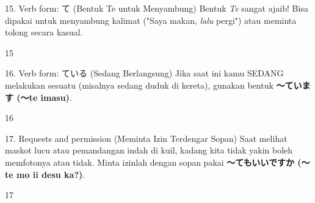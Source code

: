 \begin{lessonbox}{15. Verb form: て (Bentuk Te untuk Menyambung)}
    Bentuk \textit{Te} sangat ajaib! Bisa dipakai untuk menyambung kalimat ("Saya makan, \textit{lalu} pergi") atau meminta tolong secara kasual.
\end{lessonbox}
\begin{convobox}{15}
    \noindent
      

    \vspace{1.5em}
\end{convobox}

\begin{lessonbox}{16. Verb form: ている (Sedang Berlangsung)}
    Jika saat ini kamu SEDANG melakukan sesuatu (misalnya sedang duduk di kereta), gunakan bentuk \textbf{〜ています (〜te imasu)}.
\end{lessonbox}
\begin{convobox}{16}
    \noindent
      

    \vspace{1.5em}
\end{convobox}

\begin{lessonbox}{17. Requests and permission (Meminta Izin Terdengar Sopan)}
    Saat melihat maskot lucu atau pemandangan indah di kuil, kadang kita tidak yakin boleh memfotonya atau tidak. Minta izinlah dengan sopan pakai \textbf{〜てもいいですか (〜te mo ii desu ka?)}.
\end{lessonbox}
\begin{convobox}{17}
    \noindent
      

    \vspace{1.5em}
\end{convobox}

